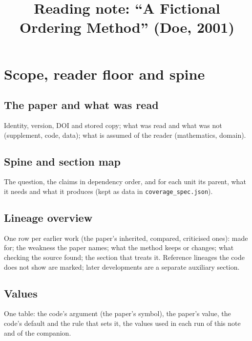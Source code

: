 \documentclass[a4paper,11pt]{article}
\begin{document}
\title{Reading note: ``A Fictional Ordering Method'' (Doe, 2001)}
\date{}
\maketitle
\tableofcontents

\section{Scope, reader floor and spine}
\subsection{The paper and what was read}
Identity, version, DOI and stored copy; what was read and what was not (supplement, code,
data); what is assumed of the reader (mathematics, domain). 

\subsection{Spine and section map}
The question, the claims in dependency order, and for each unit its parent, what it needs
and what it produces (kept as data in \texttt{coverage\_spec.json}).

\subsection{Lineage overview}\label{sec:lineage}
One row per earlier work (the paper's inherited, compared, criticised ones): made for; the
weakness the paper names; what the method keeps or changes; what checking the source found;
the section that treats it. Reference lineages the code does not show are marked; later
developments are a separate auxiliary section. 

\subsection{Values}\label{sec:values}
One table: the code's argument (the paper's symbol), the paper's value, the code's default and
the rule that sets it, the values used in each run of this note and of the companion.
\end{document}
